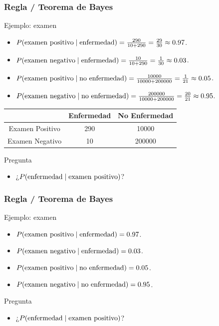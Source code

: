 \documentclass[table]{beamer}
\begin{document}
\begin{frame}
    \frametitle{Regla / Teorema de Bayes}
    \begin{block}{Ejemplo: examen}
        \begin{itemize}
            \item $\prob{\text{examen positivo} \mid \text{enfermedad}} = \frac{290}{10 + 290} = \frac{29}{30} \approx 0.97$.
            \item $\prob{\text{examen negativo} \mid \text{enfermedad}} = \frac{10}{10 + 290} = \frac{1}{30} \approx 0.03$.
            \item $\prob{\text{examen positivo} \mid \text{no enfermedad}} = \frac{10000}{10000 + 200000} = \frac{1}{21} \approx 0.05$.
            \item $\prob{\text{examen negativo} \mid \text{no enfermedad}} = \frac{200000}{10000 + 200000} = \frac{20}{21} \approx 0.95$.
        \end{itemize}
    \end{block}
    \begin{center}
        \begin{tabular}{c|cc}
            & Enfermedad & No Enfermedad \\
            \hline
            Examen Positivo & 290 & 10000 \\
            Examen Negativo & 10 & 200000 \\
        \end{tabular}
    \end{center}
    \begin{block}{Pregunta}
        \begin{itemize}
            \item ¿$\prob{\text{enfermedad} \mid \text{examen positivo}}$?
        \end{itemize}
    \end{block}
\end{frame}

\begin{frame}
    \frametitle{Regla / Teorema de Bayes}
    \begin{block}{Ejemplo: examen}
        \begin{itemize}
            \item $\prob{\text{examen positivo} \mid \text{enfermedad}} = 0.97$.
            \item $\prob{\text{examen negativo} \mid \text{enfermedad}} = 0.03$.
            \item $\prob{\text{examen positivo} \mid \text{no enfermedad}} = 0.05$.
            \item $\prob{\text{examen negativo} \mid \text{no enfermedad}} = 0.95$.
        \end{itemize}
    \end{block}
    \begin{block}{Pregunta}
        \begin{itemize}
            \item ¿$\prob{\text{enfermedad} \mid \text{examen positivo}}$?
        \end{itemize}
    \end{block}
\end{frame}
\end{document}
